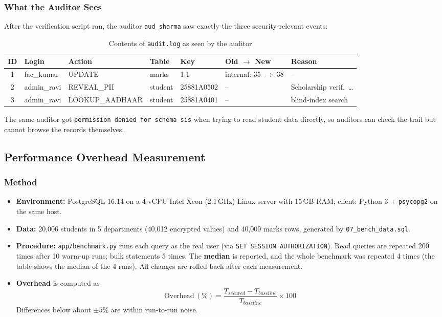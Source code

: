 \documentclass[11pt,a4paper]{report}
\begin{document}
\subsubsection{What the Auditor Sees}
After the verification script ran, the auditor \texttt{aud\_sharma} saw exactly the three security-relevant events:
\begin{table}[H]
    \centering
    \caption{Contents of \texttt{audit.log} as seen by the auditor}
    \scriptsize
    \begin{tabular}{|c|l|l|l|l|l|l|}
        \hline
        \textbf{ID} & \textbf{Login} & \textbf{Action} & \textbf{Table} & \textbf{Key} & \textbf{Old $\rightarrow$ New} & \textbf{Reason} \\ \hline
        1 & fac\_kumar & UPDATE & marks & 1,1 & internal: 35 $\rightarrow$ 38 & -- \\ \hline
        2 & admin\_ravi & REVEAL\_PII & student & 25881A0502 & -- & Scholarship verif.\ \dots \\ \hline
        3 & admin\_ravi & LOOKUP\_AADHAAR & student & 25881A0401 & -- & blind-index search \\ \hline
    \end{tabular}
\end{table}
The same auditor got \texttt{permission denied for schema sis} when trying to read student data directly, so auditors can check the trail but cannot browse the records themselves.

\subsection{Performance Overhead Measurement}
\label{sec:perf}
\subsubsection{Method}
\begin{itemize}
    \item \textbf{Environment:} PostgreSQL 16.14 on a 4-vCPU Intel Xeon (2.1\,GHz) Linux server with 15\,GB RAM; client: Python 3 + \texttt{psycopg2} on the same host.
    \item \textbf{Data:} 20,006 students in 5 departments (40,012 encrypted values) and 40,009 marks rows, generated by \texttt{07\_bench\_data.sql}.
    \item \textbf{Procedure:} \texttt{app/benchmark.py} runs each query as the real user (via \texttt{SET SESSION AUTHORIZATION}). Read queries are repeated 200 times after 10 warm-up runs; bulk statements 5 times. The \textbf{median} is reported, and the whole benchmark was repeated 4 times (the table shows the median of the 4 runs). All changes are rolled back after each measurement.
    \item \textbf{Overhead} is computed as
    $$\text{Overhead}\,(\%) = \frac{T_{secured} - T_{baseline}}{T_{baseline}} \times 100$$
    Differences below about $\pm 5\%$ are within run-to-run noise.
\end{itemize}
\end{document}

